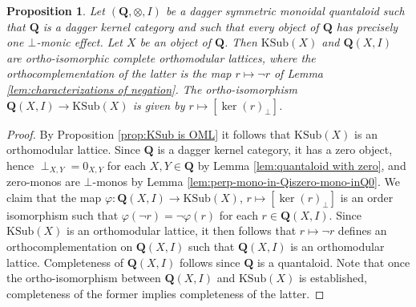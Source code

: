 \documentclass[12pt]{tac}
\newtheorem{proposition}[theorem]{Proposition}
\theoremstyle{definition}
\theoremstyle{remark}
\newcommand{\<}{\langle}
\renewcommand{\>}{\rangle}
\renewcommand{\:}{\colon}
\begin{document}
\begin{proposition}\label{prop:effects on one object form OML}
    Let $(\mathbf Q,\otimes, I)$ be a  dagger symmetric monoidal quantaloid such that $\mathbf Q$ is a dagger kernel category and such that every object of $\mathbf Q$ has precisely one $\bot$-monic effect. Let $X$ be an object of $\mathbf Q$. Then $\mathrm{KSub}(X)$ and $\mathbf Q(X,I)$ are ortho-isomorphic complete orthomodular lattices, where the orthocomplementation of the latter is the map $r\mapsto \neg r$ of Lemma \ref{lem:characterizations of negation}. The ortho-isomorphism
    $\mathbf Q(X,I)\to\mathrm{KSub}(X)$ is given by $r\mapsto [\ker(r)_\perp]$.
\end{proposition}
\begin{proof}
By Proposition \ref{prop:KSub is OML} it follows that  $\mathrm{KSub}(X)$ is an orthomodular lattice. Since $\mathbf Q$ is a dagger kernel category, it has a zero object, hence $\perp_{X,Y}=0_{X,Y}$ for each $X,Y\in\mathbf Q$ by Lemma \ref{lem:quantaloid with zero}, and zero-monos are $\bot$-monos by Lemma \ref{lem:perp-mono-in-Qiszero-mono-inQ0}.
    We claim that the map $\varphi:\mathbf Q(X,I)\to\mathrm{KSub}(X)$, $r\mapsto[\ker(r)_\perp]$ is an order isomorphism such that $\varphi(\neg r)=\neg\varphi(r)$ for each $r\in\mathbf Q(X,I)$. Since $\mathrm{KSub}(X)$ is an orthomodular lattice, it then follows that $r\mapsto\neg r$ defines an orthocomplementation on $\mathbf Q(X,I)$ such that $\mathbf Q(X,I)$ is an orthomodular lattice. Completeness of $\mathbf Q(X,I)$ follows since $\mathbf Q$ is a quantaloid. Note that once the ortho-isomorphism between $\mathbf Q(X,I)$ and $\mathrm{KSub}(X)$ is established, completeness of the former implies completeness of the latter.
    

\end{proof}
\end{document}
